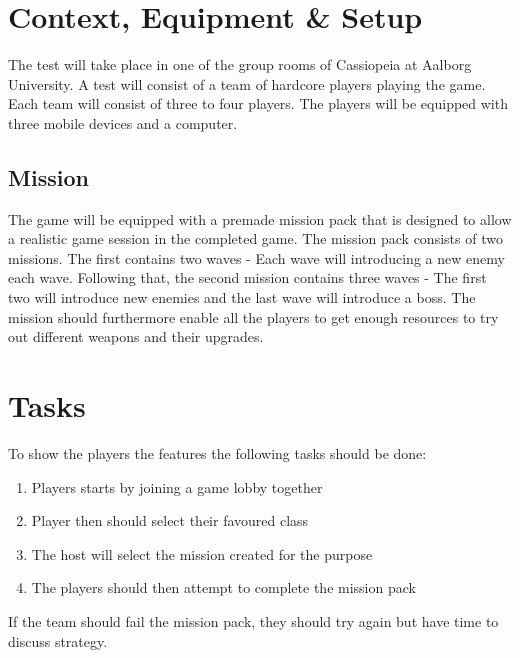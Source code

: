 \section{Context, Equipment \& Setup}
The test will take place in one of the group rooms of Cassiopeia at Aalborg University.
A test will consist of a team of hardcore players playing the game.
Each team will consist of three to four players.
The players will be equipped with three mobile devices and a computer.

\subsection{Mission}
The game will be equipped with a premade mission pack that is designed to allow a realistic game session in the completed game.
The mission pack consists of two missions.
The first contains two waves - Each wave will introducing a new enemy each wave.
Following that, the second mission contains three waves - The first two will introduce new enemies and the last wave will introduce a boss.
The mission should furthermore enable all the players to get enough resources to try out different weapons and their upgrades.

\section{Tasks}
To show the players the features the following tasks should be done:
\begin{enumerate}
	\item Players starts by joining a game lobby together
	\item Player then should select their favoured class
	\item The host will select the mission created for the purpose
	\item The players should then attempt to complete the mission pack
\end{enumerate}
If the team should fail the mission pack, they should try again but have time to discuss strategy.


